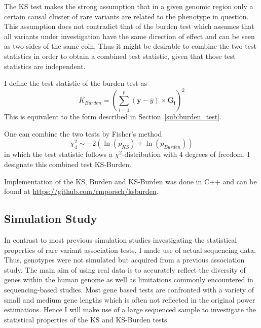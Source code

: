 The KS test makes the strong assumption that in a given genomic region only a certain causal cluster of rare variants are related to the phenotype in question.
This assumption does not contradict that of the burden test which assumes that all variants under investigation have the same direction of effect and can be seen as two sides of the same coin.
Thus it might be desirable to combine the two test statistics in order to obtain a combined test statistic, given that those test statistics are independent.

I define the test statistic of the burden test as 
\begin{equation}\label{eq:burden_simple}
  K_{Burden} = (\sum^p_{i=1} (\bm{y}-\bar{y}) \times \bm{G_i})^2
\end{equation}
This is equivalent to the form described in Section~\ref{sub:burden_test}.

One can combine the two tests by Fisher's method 
\begin{equation}
	\chi^2_4 \sim - 2 (\ln(p_{KS}) + \ln(p_{Burden}))
\end{equation}
in which the test statistic follows a $\chi^2$-distribution with $4$ degrees of freedom.
I designate this combined test KS-Burden.

Implementation of the KS, Burden and KS-Burden was done in C++ and can be found at \url{https://github.com/rmporsch/ksburden}.

\subsection{Simulation Study}
\label{sub:simulation_study}

In contrast to most previous simulation studies investigating the statistical properties of rare variant association tests, I made use of actual sequencing data.
Thus, genotypes were not simulated but acquired from a previous association study.
The main aim of using real data is to accurately reflect the diversity of genes within the human genome as well as limitations commonly encountered in sequencing-based studies.
Most gene based tests are confronted with a variety of small and medium gene lengths which is often not reflected in the original power estimations.
Hence I will make use of a large sequenced sample to investigate the statistical properties of the KS and KS-Burden tests.

